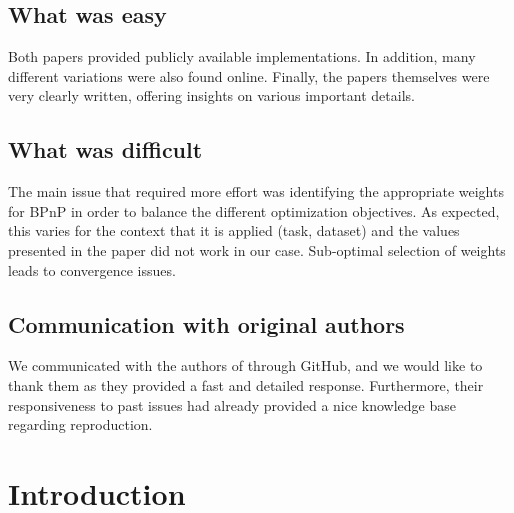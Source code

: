 \subsection*{What was easy}
Both papers provided publicly available implementations. In addition, many different variations were also found online. 
Finally, the papers themselves were very clearly written, offering insights on various important details.

\subsection*{What was difficult}
The main issue that required more effort was identifying the appropriate weights for BPnP \cite{chen2020end} in order to balance the different optimization objectives. 
As expected, this varies for the context that it is applied (task, dataset) and the values presented in the paper did not work in our case. 
Sub-optimal selection of weights leads to convergence issues.

\subsection*{Communication with original authors}
We communicated with the authors of \cite{chen2020end} through GitHub, and we would like to thank them as they provided a fast and detailed response. 
Furthermore, their responsiveness to past issues had already provided a nice knowledge base regarding reproduction.

\newpage
\section{Introduction}

